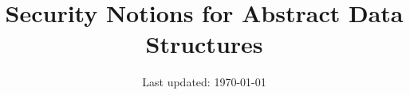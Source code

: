 \documentclass{llncs}[11pt]
\title{{\bf Security Notions for Abstract Data Structures}}
\date{}
\author{Last updated: \today}
\begin{document}
\maketitle


\begin{abstract}

\end{abstract}




%






\appendix

%
%
%
%
%
%


%
%
\end{document}
